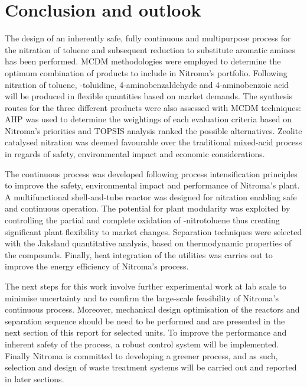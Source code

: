 \section{Conclusion and outlook}

The design of an inherently safe, fully continuous and multipurpose process for the nitration of toluene and subsequent reduction to substitute aromatic amines has been performed. MCDM methodologies were employed to determine the optimum combination of products to include in Nitroma's portfolio. Following nitration of toluene, \ortho-toluidine, 4-aminobenzaldehyde and 4-aminobenzoic acid will be produced in flexible quantities based on market demands. The synthesis routes for the three different products were also assessed with MCDM techniques: AHP was used to determine the weightings of each evaluation criteria based on Nitroma's priorities and TOPSIS analysis ranked the possible alternatives. Zeolite catalysed nitration was deemed favourable over the traditional mixed-acid process in regards of safety, environmental impact and economic considerations. 

The continuous process was developed following process intensification principles to improve the safety, environmental impact and performance of Nitroma's plant. A multifunctional shell-and-tube reactor was designed for nitration enabling safe and continuous operation. The potential for plant modularity was exploited by controlling the partial and complete oxidation of \para-nitrotoluene thus creating significant plant flexibility to market changes. Separation techniques were selected with the Jaksland quantitative analysis, based on thermodynamic properties of the compounds. Finally, heat integration of the utilities was carries out to improve the energy efficiency of Nitroma's process.

The next steps for this work involve further experimental work at lab scale to minimise uncertainty and to comfirm the large-scale feasibility of Nitroma's continuous process. Moreover, mechanical design optimisation of the reactors and separation sequence should be need to be performed and are presented in the next section of this report for selected units. To improve the performance and inherent safety of the process, a robust control system will be implemented. Finally Nitroma is committed to developing a greener process, and as such, selection and design of waste treatment systems will be carried out and reported in later sections.
